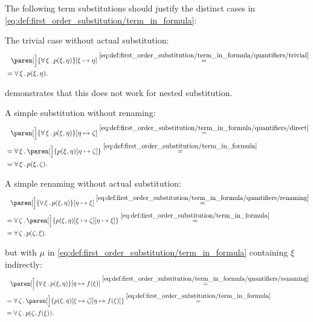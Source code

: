 \begin{example}\label{ex:first_order_substitution}
  The following term substitutions should justify the distinct cases in \eqref{eq:def:first_order_substitution/term_in_formula}:
  \begin{exenum}
     The trivial case without actual substitution:
    \begin{align*}
      &{}\phantom{=}{}
      \paren[\Big]{\qforall{\xi} p(\xi, \eta)}[\xi \mapsto \eta]
      \overset {\eqref{eq:def:first_order_substitution/term_in_formula/quantifiers/trivial}} = \\ &=
      \qforall{\xi} p(\xi, \eta).
    \end{align*}

     demonstrates that this does not work for nested substitution.

     A simple substitution without renaming:
    \begin{align*}
      &{}\phantom{=}{}
      \paren[\Big]{\qforall{\xi} p(\xi, \eta)}[\eta \mapsto \zeta]
      \overset {\eqref{eq:def:first_order_substitution/term_in_formula/quantifiers/direct}} = \\ &=
      \qforall{\xi} \paren[\Big]{p(\xi, \eta)[\eta \mapsto \zeta]}
      \overset {\eqref{eq:def:first_order_substitution/term_in_formula}} = \\ &=
      \qforall{\xi} p(\xi, \zeta).
    \end{align*}

     A simple renaming without actual substitution:
    \begin{align*}
      &{}\phantom{=}{}
      \paren[\Big]{\qforall{\xi} p(\xi, \eta)}[\eta \mapsto \xi]
      \overset {\eqref{eq:def:first_order_substitution/term_in_formula/quantifiers/renaming}} = \\ &=
      \qforall{\zeta} \paren[\Big]{p(\xi, \eta)[\xi \mapsto \zeta][\eta \mapsto \xi]}
      \overset {\eqref{eq:def:first_order_substitution/term_in_formula}} = \\ &=
      \qforall{\zeta} p(\zeta, \xi).
    \end{align*}

      but with \( \mu \) in \eqref{eq:def:first_order_substitution/term_in_formula} containing \( \xi \) indirectly:
    \begin{align*}
      &{}\phantom{=}{}
      \paren[\Big]{\qforall{\xi} p(\xi, \eta)}[\eta \mapsto f(\xi)]
      \overset {\eqref{eq:def:first_order_substitution/term_in_formula/quantifiers/renaming}} = \\ &=
      \qforall{\zeta} \paren[\Big]{p(\xi, \eta)[\xi \mapsto \zeta][\eta \mapsto f(\xi)]}
      \overset {\eqref{eq:def:first_order_substitution/term_in_formula}} = \\ &=
      \qforall{\zeta} p(\zeta, f(\xi)).
    \end{align*}


\end{exenum}
\end{example}
